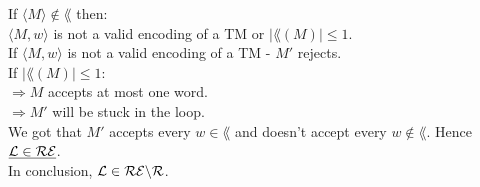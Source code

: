 If $\langle M \rangle \notin \lang$ then: \\
$\langle M, w \rangle$ is not a valid encoding of a TM or $|\lang(M)| \leq 1$. \\
If $\langle M, w \rangle$ is not a valid encoding of a TM - $M'$ rejects. \\
If $|\lang(M)| \leq 1$: \\
$\Rightarrow M$ accepts at most one word. \\
$\Rightarrow M'$ will be stuck in the loop. \\

We got that $M'$ accepts every $w \in \lang$ and doesn't accept every $w \notin \lang$. Hence $\underline{\mathcal{L} \in \mathcal{R}\mathcal{E}}$. \\
In conclusion, $\mathcal{L} \in \mathcal{R}\mathcal{E} \backslash \mathcal{R}$. \\

